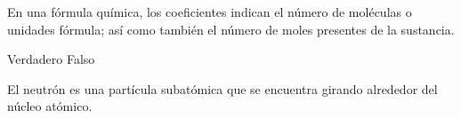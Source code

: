 \begin{multicols}{2}
\begin{parts}




        En una fórmula química, los coeficientes indican el número de moléculas o unidades fórmula; así como también el número de moles presentes de la sustancia.

        \begin{oneparcheckboxes}
            \CorrectChoice Verdadero
            \choice Falso
        \end{oneparcheckboxes}



        El neutrón es una partícula subatómica que se encuentra girando alrededor del núcleo atómico.


\end{parts}
\end{multicols}
